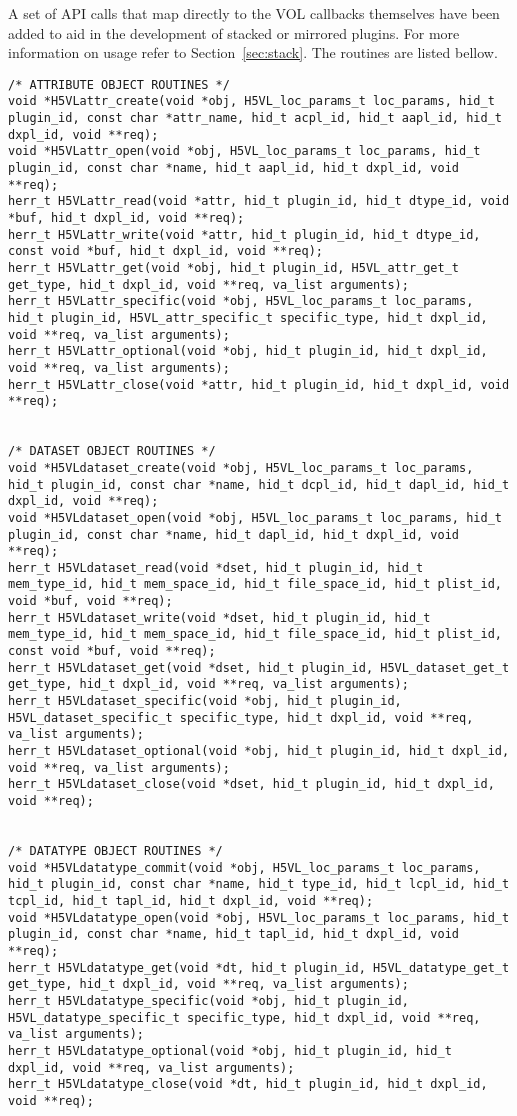 A set of API calls that map directly to the VOL callbacks themselves have been added to aid in the development of stacked or mirrored plugins. For more information on usage refer to Section~\ref{sec:stack}. The routines are listed bellow.
\begin{lstlisting}
/* ATTRIBUTE OBJECT ROUTINES */
void *H5VLattr_create(void *obj, H5VL_loc_params_t loc_params, hid_t plugin_id, const char *attr_name, hid_t acpl_id, hid_t aapl_id, hid_t dxpl_id, void **req);
void *H5VLattr_open(void *obj, H5VL_loc_params_t loc_params, hid_t plugin_id, const char *name, hid_t aapl_id, hid_t dxpl_id, void **req);
herr_t H5VLattr_read(void *attr, hid_t plugin_id, hid_t dtype_id, void *buf, hid_t dxpl_id, void **req);
herr_t H5VLattr_write(void *attr, hid_t plugin_id, hid_t dtype_id, const void *buf, hid_t dxpl_id, void **req);
herr_t H5VLattr_get(void *obj, hid_t plugin_id, H5VL_attr_get_t get_type, hid_t dxpl_id, void **req, va_list arguments);
herr_t H5VLattr_specific(void *obj, H5VL_loc_params_t loc_params, hid_t plugin_id, H5VL_attr_specific_t specific_type, hid_t dxpl_id, void **req, va_list arguments);
herr_t H5VLattr_optional(void *obj, hid_t plugin_id, hid_t dxpl_id, void **req, va_list arguments);
herr_t H5VLattr_close(void *attr, hid_t plugin_id, hid_t dxpl_id, void **req);


/* DATASET OBJECT ROUTINES */
void *H5VLdataset_create(void *obj, H5VL_loc_params_t loc_params, hid_t plugin_id, const char *name, hid_t dcpl_id, hid_t dapl_id, hid_t dxpl_id, void **req);
void *H5VLdataset_open(void *obj, H5VL_loc_params_t loc_params, hid_t plugin_id, const char *name, hid_t dapl_id, hid_t dxpl_id, void **req);
herr_t H5VLdataset_read(void *dset, hid_t plugin_id, hid_t mem_type_id, hid_t mem_space_id, hid_t file_space_id, hid_t plist_id, void *buf, void **req);
herr_t H5VLdataset_write(void *dset, hid_t plugin_id, hid_t mem_type_id, hid_t mem_space_id, hid_t file_space_id, hid_t plist_id, const void *buf, void **req);
herr_t H5VLdataset_get(void *dset, hid_t plugin_id, H5VL_dataset_get_t get_type, hid_t dxpl_id, void **req, va_list arguments);
herr_t H5VLdataset_specific(void *obj, hid_t plugin_id, H5VL_dataset_specific_t specific_type, hid_t dxpl_id, void **req, va_list arguments);
herr_t H5VLdataset_optional(void *obj, hid_t plugin_id, hid_t dxpl_id, void **req, va_list arguments);
herr_t H5VLdataset_close(void *dset, hid_t plugin_id, hid_t dxpl_id, void **req);


/* DATATYPE OBJECT ROUTINES */
void *H5VLdatatype_commit(void *obj, H5VL_loc_params_t loc_params, hid_t plugin_id, const char *name, hid_t type_id, hid_t lcpl_id, hid_t tcpl_id, hid_t tapl_id, hid_t dxpl_id, void **req);
void *H5VLdatatype_open(void *obj, H5VL_loc_params_t loc_params, hid_t plugin_id, const char *name, hid_t tapl_id, hid_t dxpl_id, void **req);
herr_t H5VLdatatype_get(void *dt, hid_t plugin_id, H5VL_datatype_get_t get_type, hid_t dxpl_id, void **req, va_list arguments);
herr_t H5VLdatatype_specific(void *obj, hid_t plugin_id, H5VL_datatype_specific_t specific_type, hid_t dxpl_id, void **req, va_list arguments);
herr_t H5VLdatatype_optional(void *obj, hid_t plugin_id, hid_t dxpl_id, void **req, va_list arguments);
herr_t H5VLdatatype_close(void *dt, hid_t plugin_id, hid_t dxpl_id, void **req);



\end{lstlisting}
